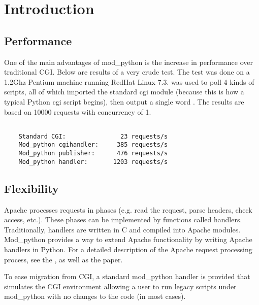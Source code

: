 \chapter{Introduction\label{introduction}}

\section{Performance\label{intr-performance}}

  One of the main advantages of mod_python is the increase in
  performance over traditional CGI. Below are results of a very crude
  test. The test was done on a 1.2Ghz Pentium machine running RedHat
  Linux
  7.3. 
  was used to poll 4 kinds of scripts, all of which imported the
  standard cgi module (because this is how a typical Python cgi script
  begins), then output a single word . The results are
  based on 10000 requests with concurrency of 1.

\begin{verbatim}

    Standard CGI:               23 requests/s
    Mod_python cgihandler:     385 requests/s
    Mod_python publisher:      476 requests/s
    Mod_python handler:       1203 requests/s

\end{verbatim}         

\section{Flexibility\label{intr-flexibility}}

  Apache processes requests in phases (e.g. read the request, parse
  headers, check access, etc.). These phases can be implemented by
  functions called handlers. Traditionally, handlers are written in C
  and compiled into Apache modules. Mod_python provides a way to
  extend Apache functionality by writing Apache handlers in
  Python. For a detailed description of the Apache request processing
  process, see the , as well as the
   paper.

  To ease migration from CGI, a standard mod_python handler is
  provided that simulates the CGI environment allowing a user to run
  legacy scripts under mod_python with no changes to the code (in most
  cases).
 

